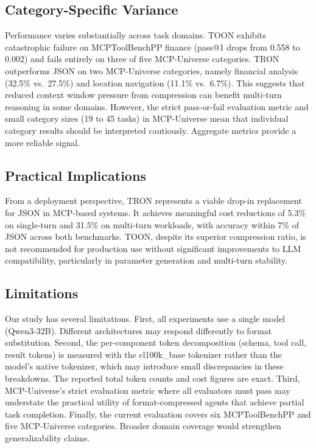 \documentclass[11pt]{article}
\begin{document}
\subsection{Category-Specific Variance}

Performance varies substantially across task domains. TOON exhibits catastrophic failure on MCPToolBenchPP finance (pass@1 drops from 0.558 to 0.002) and fails entirely on three of five MCP-Universe categories. TRON outperforms JSON on two MCP-Universe categories, namely financial analysis (32.5\% vs.\ 27.5\%) and location navigation (11.1\% vs.\ 6.7\%). This suggests that reduced context window pressure from compression can benefit multi-turn reasoning in some domains. However, the strict pass-or-fail evaluation metric and small category sizes (19 to 45 tasks) in MCP-Universe mean that individual category results should be interpreted cautiously. Aggregate metrics provide a more reliable signal.

\subsection{Practical Implications}

From a deployment perspective, TRON represents a viable drop-in replacement for JSON in MCP-based systems. It achieves meaningful cost reductions of 5.3\% on single-turn and 31.5\% on multi-turn workloads, with accuracy within 7\% of JSON across both benchmarks. TOON, despite its superior compression ratio, is not recommended for production use without significant improvements to LLM compatibility, particularly in parameter generation and multi-turn stability.

\subsection{Limitations}

Our study has several limitations. First, all experiments use a single model (Qwen3-32B). Different architectures may respond differently to format substitution. Second, the per-component token decomposition (schema, tool call, result tokens) is measured with the cl100k\_base tokenizer rather than the model's native tokenizer, which may introduce small discrepancies in these breakdowns. The reported total token counts and cost figures are exact. Third, MCP-Universe's strict evaluation metric where all evaluators must pass may understate the practical utility of format-compressed agents that achieve partial task completion. Finally, the current evaluation covers six MCPToolBenchPP and five MCP-Universe categories. Broader domain coverage would strengthen generalizability claims.
\end{document}
